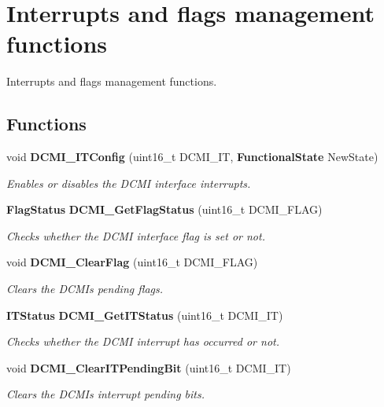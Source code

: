 \section{Interrupts and flags management functions}
\label{group__DCMI__Group3}


Interrupts and flags management functions.  


\subsection*{Functions}
\begin{DoxyCompactItemize}
\item 
void \textbf{ D\+C\+M\+I\+\_\+\+I\+T\+Config} (uint16\+\_\+t D\+C\+M\+I\+\_\+\+IT, \textbf{ Functional\+State} New\+State)
\begin{DoxyCompactList}\small\item\em Enables or disables the D\+C\+MI interface interrupts. \end{DoxyCompactList}\item 
\textbf{ Flag\+Status} \textbf{ D\+C\+M\+I\+\_\+\+Get\+Flag\+Status} (uint16\+\_\+t D\+C\+M\+I\+\_\+\+F\+L\+AG)
\begin{DoxyCompactList}\small\item\em Checks whether the D\+C\+MI interface flag is set or not. \end{DoxyCompactList}\item 
void \textbf{ D\+C\+M\+I\+\_\+\+Clear\+Flag} (uint16\+\_\+t D\+C\+M\+I\+\_\+\+F\+L\+AG)
\begin{DoxyCompactList}\small\item\em Clears the D\+C\+MI\textquotesingle{}s pending flags. \end{DoxyCompactList}\item 
\textbf{ I\+T\+Status} \textbf{ D\+C\+M\+I\+\_\+\+Get\+I\+T\+Status} (uint16\+\_\+t D\+C\+M\+I\+\_\+\+IT)
\begin{DoxyCompactList}\small\item\em Checks whether the D\+C\+MI interrupt has occurred or not. \end{DoxyCompactList}\item 
void \textbf{ D\+C\+M\+I\+\_\+\+Clear\+I\+T\+Pending\+Bit} (uint16\+\_\+t D\+C\+M\+I\+\_\+\+IT)
\begin{DoxyCompactList}\small\item\em Clears the D\+C\+MI\textquotesingle{}s interrupt pending bits. \end{DoxyCompactList}\end{DoxyCompactItemize}


